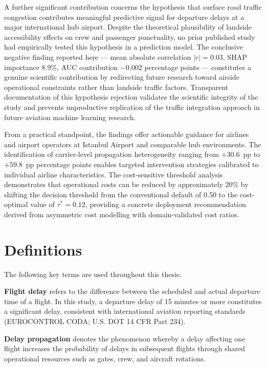 \documentclass{report}
\begin{document}
A further significant contribution concerns the hypothesis that surface road 
traffic congestion contributes meaningful predictive signal for departure delays 
at a major international hub airport. Despite the theoretical plausibility of 
landside accessibility effects on crew and passenger punctuality, no prior 
published study had empirically tested this hypothesis in a prediction model. 
The conclusive negative finding reported here --- mean absolute correlation 
$|r| = 0.03$, SHAP importance 8.9\%, AUC contribution $-0.002$ percentage 
points --- constitutes a genuine scientific contribution by redirecting future 
research toward airside operational constraints rather than landside traffic 
factors. Transparent documentation of this hypothesis rejection validates the 
scientific integrity of the study and prevents unproductive replication of the 
traffic integration approach in future aviation machine learning research.

From a practical standpoint, the findings offer actionable guidance for airlines 
and airport operators at Istanbul Airport and comparable hub environments. The identification of carrier-level propagation heterogeneity ranging from $+30.6$~pp to $+59.8$~pp percentage points enables targeted intervention strategies calibrated to individual airline characteristics. The cost-sensitive threshold analysis 
demonstrates that operational costs can be reduced by approximately 20\% by 
shifting the decision threshold from the conventional default of 0.50 to the 
cost-optimal value of $\tau^* = 0.12$, providing a concrete deployment 
recommendation derived from asymmetric cost modelling with domain-validated 
cost ratios.

\section{Definitions}

The following key terms are used throughout this thesis:

\textbf{Flight delay} refers to the difference between the scheduled and actual departure time of a flight. In this study, a departure delay of 15 minutes or more constitutes a significant delay, consistent with international aviation reporting standards (EUROCONTROL CODA; U.S. DOT 14 CFR Part 234).

\textbf{Delay propagation} denotes the phenomenon whereby a delay affecting one flight increases the probability of delays in subsequent flights through shared operational resources such as gates, crew, and aircraft rotations.
\end{document}
